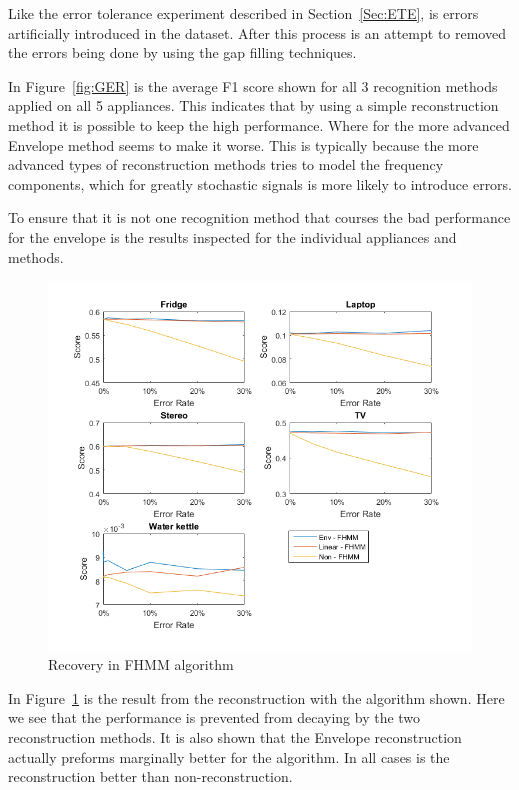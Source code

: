 Like the error tolerance experiment described in Section~\ref{Sec:ETE}, is errors artificially introduced in the dataset. After this process is an attempt to removed the errors being done by using the gap filling techniques. 

In Figure~\ref{fig:GER} is the average F1 score shown for all 3 recognition methods applied on all 5 appliances. This indicates that by using a simple reconstruction method it is possible to keep the high performance. Where for the more advanced Envelope method seems to make it worse. This is typically because the more advanced types of reconstruction methods tries to model the frequency components, which for greatly stochastic signals is more likely to introduce errors. 

To ensure that it is not one recognition method that courses the bad performance for the envelope is the results inspected for the individual appliances and methods. 


\newpage

\begin{figure}[H]
\centering
\includegraphics[width=1\textwidth]{billeder/Rec-FHMM.png}
\caption{Recovery in FHMM algorithm}
\label{fig:ERFHMM}
\end{figure}

In Figure~\ref{fig:ERFHMM} is the result from the reconstruction with the  algorithm shown. Here we see that the performance is prevented from decaying by the two reconstruction methods. It is also shown that the Envelope reconstruction actually preforms marginally better for the  algorithm. In all cases is the reconstruction better than non-reconstruction. 

